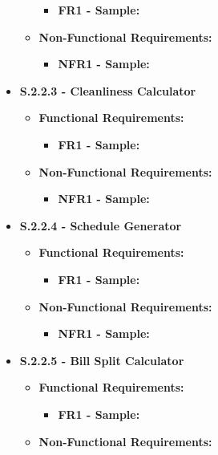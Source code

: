 \documentclass{scrreprt}
\theoremstyle{definition}
\begin{document}
\begin{flushleft}
\begin{itemize}
\begin{itemize}
  		\begin{itemize}
  			\item \textbf{FR1 - Sample:}
  		\end{itemize}
  		\item \textbf{Non-Functional Requirements:}
  		\begin{itemize}
  			\item \textbf{NFR1 - Sample:}
  		\end{itemize}
  	\end{itemize}
  	\item \textbf{S.2.2.3 - Cleanliness Calculator}
  	\begin{itemize}
  		\item \textbf{Functional Requirements:}
  		\begin{itemize}
  			\item \textbf{FR1 - Sample:}
  		\end{itemize}
  		\item \textbf{Non-Functional Requirements:}
  		\begin{itemize}
  			\item \textbf{NFR1 - Sample:}
  		\end{itemize}
  	\end{itemize}
  	\item \textbf{S.2.2.4 - Schedule Generator}
  	\begin{itemize}
  		\item \textbf{Functional Requirements:}
  		\begin{itemize}
  			\item \textbf{FR1 - Sample:}
  		\end{itemize}
  		\item \textbf{Non-Functional Requirements:}
  		\begin{itemize}
  			\item \textbf{NFR1 - Sample:}
  		\end{itemize}
  	\end{itemize}
  	\item \textbf{S.2.2.5 - Bill Split Calculator}
  	\begin{itemize}
  		\item \textbf{Functional Requirements:}
  		\begin{itemize}
  			\item \textbf{FR1 - Sample:}
  		\end{itemize}
  		\item \textbf{Non-Functional Requirements:}
  		\begin{itemize}

\end{itemize}
\end{itemize}
\end{itemize}
\end{flushleft}
\end{document}
